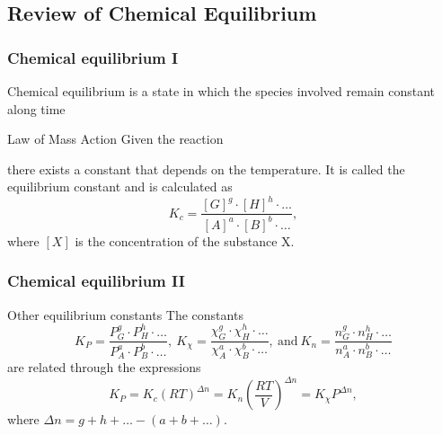 \documentclass{beamer}
\begin{document}

\subsection{Review of Chemical Equilibrium}


\begin{frame}
\frametitle{Chemical equilibrium I}
Chemical equilibrium is a state in which the species involved remain constant along time
\begin{block}{Law of Mass Action}
Given the reaction
\begin{center}
\end{center}
there exists a constant that depends on the temperature. It is called the equilibrium constant and is calculated as
\begin{equation*}
K_c = \frac{[G]^g\cdot [H]^h\cdot\dots}{[A]^a\cdot [B]^b\cdot\dots},
\end{equation*}
where $[X]$ is the concentration of the substance X.
\end{block}
\end{frame}


\begin{frame}
\frametitle{Chemical equilibrium II}
\begin{block}{Other equilibrium constants}
The constants
\begin{equation*}
K_P = \frac{P_G^g\cdot P_H^h\cdot\dots}{P_A^a\cdot P_B^b\cdot\dots},  \ K_\chi = \frac{\chi_G^g\cdot\chi_H^h\cdot\dots}{\chi_A^a\cdot \chi_B^b\cdot\dots}, \ \text{and} \ K_n = \frac{n_G^g\cdot n_H^h\cdot\dots}{n_A^a\cdot n_B^b\cdot\dots}
\end{equation*}
are related through the expressions
\begin{equation*}
K_P = K_c(RT)^{\Delta n} = K_n\left(\frac{RT}{V}\right)^{\Delta n} = K_\chi P^{\Delta n},
\end{equation*}
where $\Delta n= g + h + \dots - (a + b + \dots)$.
\end{block}
\end{frame}

\end{document}
